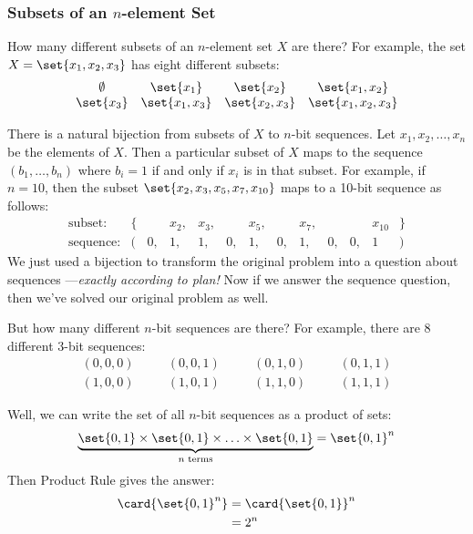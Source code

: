 \subsubsection*{Subsets of an $n$-element Set}

How many different subsets of an $n$-element set $X$ are there?  For
example, the set $X = \set{x_1, x_2, x_3}$ has eight different subsets:
%
\[
\begin{array}{cccc}
\emptyset & \set{x_1} & \set{x_2} & \set{x_1, x_2} \\
\set{x_3} & \set{x_1, x_3} & \set{x_2, x_3} & \set{x_1, x_2, x_3}
\end{array}
\]

There is a natural bijection from subsets of $X$ to $n$-bit sequences.
Let $x_1, x_2, \ldots, x_n$ be the elements of $X$.  Then a particular
subset of $X$ maps to the sequence $(b_1, \ldots, b_n)$ where $b_i =
1$ if and only if $x_i$ is in that subset.  For example, if $n = 10$,
then the subset $\set{x_2, x_3, x_5, x_7, x_{10}}$ maps to a 10-bit
sequence as follows:
%
\[
\begin{array}{rrrrrrrrrrrrr}
\text{subset:} &
\{ &    & x_2, & x_3, &    & x_5, &   & x_7, &    &    & x_{10} & \} \\
\text{sequence:} &
(  & 0, &   1, &   1, & 0, &   1, & 0, &   1, & 0, & 0, &        1 & )
\end{array}
\]
%
We just used a bijection to transform the original problem into a
question about sequences ---\emph{exactly according to plan!}  Now
if we answer the sequence question, then we've solved our original
problem as well.

But how many different $n$-bit sequences are there?  For example,
there are 8 different 3-bit sequences:
%
\[
\begin{array}{ccccccc}
(0,0,0) & \quad & (0,0,1) & \quad & (0,1,0) & \quad & (0,1,1) \\
(1,0,0) & \quad & (1,0,1) & \quad & (1,1,0) & \quad & (1,1,1)
\end{array}
\]

Well, we can write the set of all $n$-bit sequences as a product of
sets:
%
\[
\underbrace{\set{0,1} \times \set{0,1} \times
        \ldots \times \set{0,1}}_{\text{$n$ terms}} = \set{0,1}^n
\]
%
Then Product Rule gives the answer:
%
\begin{align*}
\card{\set{0,1}^n}
    & = \card{\set{0,1}}^n \\
    & = 2^n
\end{align*}

